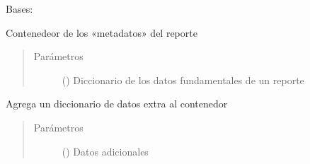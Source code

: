 \documentclass[a4paper,12pt,spanish]{sphinxmanual}
\begin{document}
\begin{fulllineitems}
\label{\detokenize{openerm.MetadataContainer:openerm.MetadataContainer.MetadataContainer}}
Bases: 

Contenedeor de los «metadatos» del reporte
\begin{quote}\begin{description}
\item[{Parámetros}] \leavevmode
{} () \textendash{} Diccionario de los datos fundamentales de un reporte

\end{description}\end{quote}

\begin{fulllineitems}
\label{\detokenize{openerm.MetadataContainer:openerm.MetadataContainer.MetadataContainer.add}}
Agrega un diccionario de datos extra al contenedor
\begin{quote}\begin{description}
\item[{Parámetros}] \leavevmode
{} () \textendash{} Datos adicionales


\end{description}
\end{quote}
\end{fulllineitems}
\end{fulllineitems}
\end{document}
